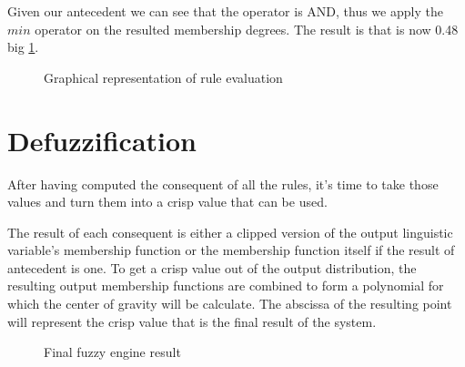 Given our antecedent  we can see that the operator is AND, thus we
apply the $min$ operator on the resulted membership degrees. The result is that  is now 0.48 big
\ref{fig:rule_eval}.

\begin{figure}[h!]
    \centerline{}
    \caption[Graphical representation of rule evaluation]{Graphical representation of rule evaluation}
\label{fig:rule_eval}
\end{figure}

\section{Defuzzification}

\qquad After having computed the consequent of all the rules, it's time to take those values and turn them
into a crisp value that can be used.

\quad The result of each consequent is either a clipped version of the output linguistic variable's
membership function or the membership function itself if the result of antecedent is one.
To get a crisp value out of the output distribution, the resulting output membership functions are combined
to form a polynomial for which the center of gravity will be calculate. The abscissa of the resulting point
will represent the crisp value that is the final result of the system.

\begin{figure}[h!]
    \centerline{}
    \caption[Final fuzzy engine result]{Final fuzzy engine result}
\label{fig:final_res}
\end{figure}
